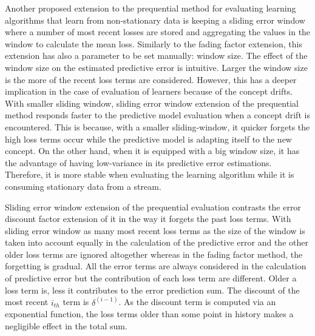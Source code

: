 Another proposed extension to the prequential method for evaluating learning algorithms that learn from non-stationary data is keeping a sliding error window where a number of most recent losses are stored and aggregating the values in the window to calculate the mean loss. Similarly to the fading factor extension, this extension has also a parameter to be set manually: window size. The effect of the window size on the estimated predictive error is intuitive. Larger the window size is the more of the recent loss terms are considered. However, this has a deeper implication in the case of evaluation of learners because of the concept drifts. With smaller sliding window, sliding error window extension of the prequential method responds faster to the predictive model evaluation when a concept drift is encountered. This is because, with a smaller sliding-window, it quicker forgets the high loss terms occur while the predictive model is adapting itself to the new concept. On the other hand, when it is equipped with a big window size, it has the advantage of having low-variance in its predictive error estimations. Therefore, it is more stable when evaluating the learning algorithm while it is consuming stationary data from a stream.

Sliding error window extension of the prequential evaluation contrasts the error discount factor extension of it in the way it forgets the past loss terms. With sliding error window as many most recent loss terms as the size of the window is taken into account equally in the calculation of the predictive error and the other older loss terms are ignored altogether whereas in the fading factor method, the forgetting is gradual. All the error terms are always considered in the calculation of predictive error but the contribution of each loss term are different. Older a loss term is, less it contributes to the error prediction sum. The discount of the most recent $i_{th}$ term is $\delta^(i-1)$. As the discount term is computed via an exponential function, the loss terms older than some point in history makes a negligible effect in the total sum.

